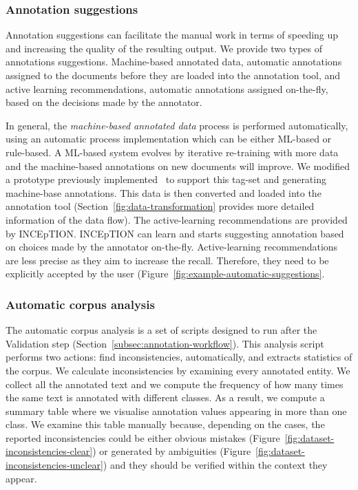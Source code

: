 \documentclass[fleqn,10pt]{wlscirep}
\begin{document}
\subsubsection*{Annotation suggestions}
\label{subsec:automatic-system-prototype}

Annotation suggestions can facilitate the manual work in terms of speeding up and increasing the quality of the resulting output. 
We provide two types of annotations suggestions. Machine-based annotated data, automatic annotations assigned to the documents before they are loaded into the annotation tool, and active learning recommendations, automatic annotations assigned on-the-fly, based on the decisions made by the annotator.

In general, the \textit{machine-based annotated data} process is performed automatically, using an automatic process implementation which can be either ML-based or rule-based. 
A ML-based system evolves by iterative re-training with more data and the machine-based annotations on new documents will improve. 
We modified a prototype previously implemented~\cite{foppiano2019proposal} to support this tag-set and generating machine-base annotations. This data is then converted and loaded into the annotation tool (Section~\ref{fig:data-transformation} provides more detailed information of the data flow). 
The active-learning recommendations are provided by INCEpTION. INCEpTION can learn and starts suggesting annotation based on choices made by the annotator on-the-fly. Active-learning recommendations are less precise as they aim to increase the recall. Therefore, they need to be explicitly accepted by the user (Figure~\ref{fig:example-automatic-suggestions}. 

\subsubsection*{Automatic corpus analysis}
The automatic corpus analysis is a set of scripts designed to run after the Validation step (Section~\ref{subsec:annotation-workflow}). 
This analysis script performs two actions: find inconsistencies, automatically, and extracts statistics of the corpus. 
We calculate inconsistencies by examining every annotated entity. 
We collect all the annotated text and we compute the frequency of how many times the same text is annotated with different classes. 
As a result, we compute a summary table where we visualise annotation values appearing in more than one class.
We examine this table manually because, depending on the cases, the reported inconsistencies could be either obvious mistakes (Figure~\ref{fig:dataset-inconsistencies-clear}) or generated by ambiguities (Figure~\ref{fig:dataset-inconsistencies-unclear}) and they should be verified within the context they appear. 
\end{document}
